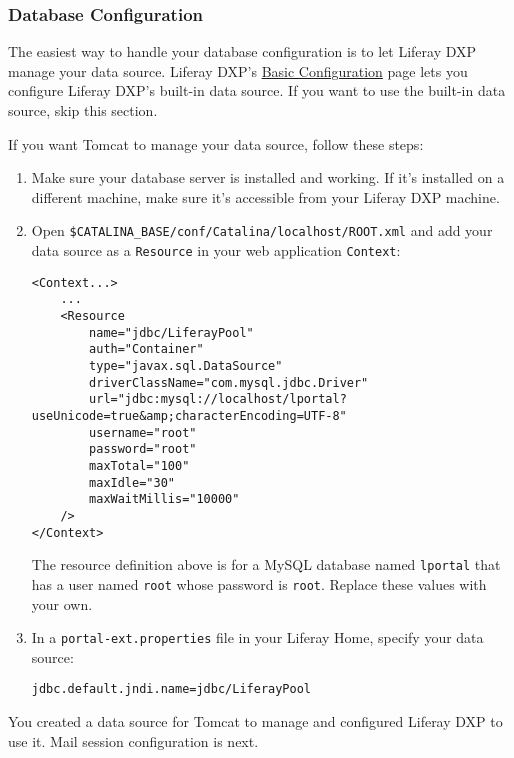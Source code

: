 \subsubsection{Database Configuration}\label{database-configuration}

The easiest way to handle your database configuration is to let Liferay
DXP manage your data source. Liferay DXP's
\href{/docs/7-1/deploy/-/knowledge_base/d/installing-liferay\#using-the-setup-wizard}{Basic
Configuration} page lets you configure Liferay DXP's built-in data
source. If you want to use the built-in data source, skip this section.

If you want Tomcat to manage your data source, follow these steps:

\begin{enumerate}
\def\labelenumi{\arabic{enumi}.}
\item
  Make sure your database server is installed and working. If it's
  installed on a different machine, make sure it's accessible from your
  Liferay DXP machine.
\item
  Open \texttt{\$CATALINA\_BASE/conf/Catalina/localhost/ROOT.xml} and
  add your data source as a \texttt{Resource} in your web application
  \texttt{Context}:

\begin{verbatim}
<Context...>
    ...
    <Resource
        name="jdbc/LiferayPool"
        auth="Container"
        type="javax.sql.DataSource"
        driverClassName="com.mysql.jdbc.Driver"
        url="jdbc:mysql://localhost/lportal?useUnicode=true&amp;characterEncoding=UTF-8"
        username="root"
        password="root"
        maxTotal="100"
        maxIdle="30"
        maxWaitMillis="10000"
    />
</Context>
\end{verbatim}

  The resource definition above is for a MySQL database named
  \texttt{lportal} that has a user named \texttt{root} whose password is
  \texttt{root}. Replace these values with your own.
\item
  In a \texttt{portal-ext.properties} file in your Liferay Home, specify
  your data source:

\begin{verbatim}
jdbc.default.jndi.name=jdbc/LiferayPool
\end{verbatim}
\end{enumerate}

You created a data source for Tomcat to manage and configured Liferay
DXP to use it. Mail session configuration is next.

